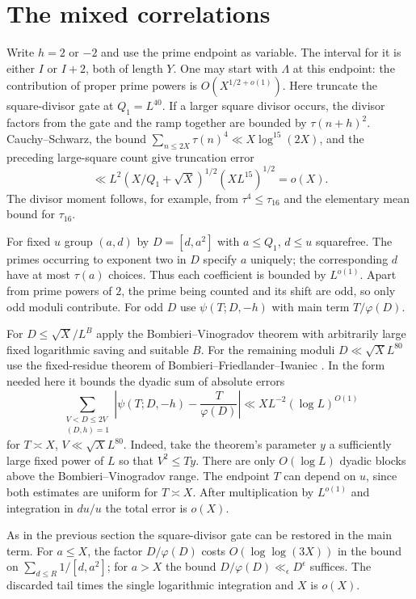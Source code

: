 \documentclass[11pt]{article}
\begin{document}
\section{The mixed correlations}
Write $h=2$ or $-2$ and use the prime endpoint as variable.
The interval for it is either $I$ or $I+2$, both of length $Y$.
One may start with $\Lambda$ at this endpoint: the contribution
of proper prime powers is $O(X^{1/2+o(1)})$.
Here truncate the square-divisor gate at $Q_1=L^{40}$.
If a larger square divisor occurs, the divisor factors from the
gate and the ramp together are bounded by $\tau(n+h)^2$.
Cauchy--Schwarz, the bound
$\sum_{n\le 2X}\tau(n)^4\ll X\log^{15}(2X)$, and the preceding
large-square count give truncation error
\[
 \ll L^2(X/Q_1+\sqrt X)^{1/2}(XL^{15})^{1/2}=o(X).
\]
The divisor moment follows, for example, from $\tau^4\le\tau_{16}$
and the elementary mean bound for $\tau_{16}$.

For fixed $u$ group $(a,d)$ by $D=[d,a^2]$ with $a\le Q_1$,
$d\le u$ squarefree. The primes occurring to exponent two in
$D$ specify $a$ uniquely; the corresponding $d$ have at most
$\tau(a)$ choices. Thus each coefficient is bounded by
$L^{o(1)}$. Apart from prime powers of $2$, the prime being counted
and its shift are odd, so only odd moduli contribute.
For odd $D$ use $\psi(T;D,-h)$ with main term $T/\varphi(D)$.

For $D\le \sqrt X/L^B$ apply the Bombieri--Vinogradov theorem
with arbitrarily large fixed logarithmic saving and suitable $B$.
For the remaining moduli
$D\ll\sqrt X L^{80}$ use the fixed-residue theorem of
Bombieri--Friedlander--Iwaniec \cite{BFI}. In the form needed here
it bounds the dyadic sum of absolute errors
\[
 \sum_{\substack{V<D\le2V\\(D,h)=1}}
 \left|\psi(T;D,-h)-\frac{T}{\varphi(D)}\right|
 \ll X L^{-2}(\log L)^{O(1)}
\]
for $T\asymp X$, $V\ll\sqrt X L^{80}$.
Indeed, take the theorem's parameter $y$ a sufficiently large
fixed power of $L$ so that $V^2\le Ty$. There are only
$O(\log L)$ dyadic blocks above the Bombieri--Vinogradov range.
The endpoint $T$ can depend on $u$, since both estimates are uniform
for $T\asymp X$. After multiplication by $L^{o(1)}$ and integration
in $du/u$ the total error is $o(X)$.

As in the previous section the square-divisor gate can be
restored in the main term. For $a\le X$, the factor $D/\varphi(D)$
costs $O(\log\log(3X))$ in the bound on $\sum_{d\le R}1/[d,a^2]$;
for $a>X$ the bound $D/\varphi(D)\ll_\epsilon D^\epsilon$ suffices.
The discarded tail times the single logarithmic integration and $X$
is $o(X)$.
\end{document}
